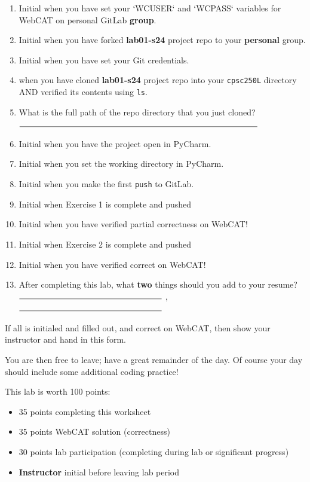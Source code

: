\documentclass[notitlepage,12pt]{../../cpsc250l}
\begin{document}
\begin{enumerate}
	\begin{enumerate}
	\item \initial Initial when you have set your `WCUSER` and `WCPASS` variables for WebCAT on personal GitLab \textbf{group}.
	\item \initial Initial when you have forked \textbf{lab01-s24} project repo to your \textbf{personal} group.
	\item \initial Initial when you have set your Git credentials.
	\item \initial when you have cloned \textbf{lab01-s24} project repo into your \texttt{cpsc250L} directory AND verified its contents using \texttt{ls}.
	\item What is the full path of the repo directory that you just cloned?\\ $\rule{10cm}{0.15mm}$
	\item \initial Initial when you have the project open in PyCharm.
	\item \initial Initial when you set the working directory in PyCharm.
	\item \initial Initial when you make the first \texttt{push} to GitLab.
	\item \initial Initial when Exercise 1 is complete and pushed
	\item \initial Initial when you have verified partial correctness on WebCAT!
	\item \initial Initial when Exercise 2 is complete and pushed
	\item \initial Initial when you have verified correct on WebCAT!
	\item After completing this lab, what \textbf{two} things should you add to your resume? \\
	$\rule{6cm}{0.15mm}$ , $\rule{6cm}{0.15mm}$

	\end{enumerate}
\end{enumerate}

If all is initialed and filled out, and correct on WebCAT, then
show your instructor and hand in this form.

You are then free to leave; have a great remainder of the day.
Of course your day should include some additional coding practice!

This lab is worth 100 points:
\begin{itemize}
 \item 35 points completing this worksheet
 \item 35 points WebCAT solution (correctness)
 \item 30 points lab participation (completing during lab or significant progress)
 \item \initial \textbf{Instructor} initial before leaving lab period
\end{itemize}
\end{document}
